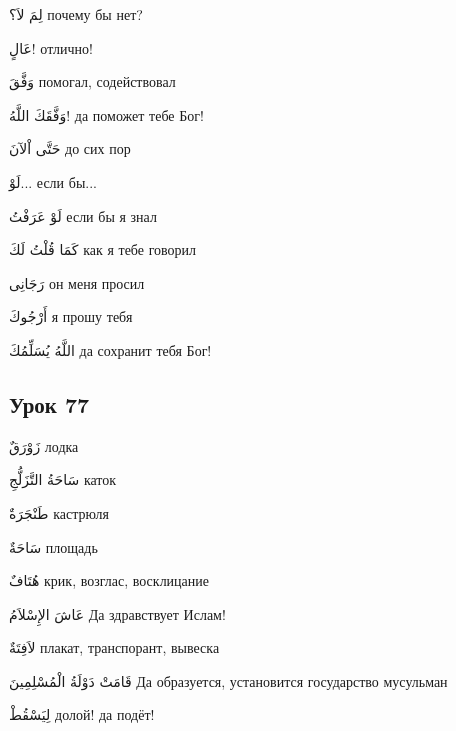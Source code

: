\documentclass[a5paper]{article}
\newcommand\textstyleDropCaps[1]{#1}
\newcommand\textstyleCaptioncharacters[1]{#1}
\begin{document}
\textstyleCaptioncharacters{لِمَ لاَ؟ }\textstyleDropCaps{почему бы нет?‎}

\textstyleCaptioncharacters{عَالٍ!ِ }\textstyleDropCaps{отлично!‎}

\textstyleCaptioncharacters{وَفَّقَ }\textstyleDropCaps{помогал, содейство­вал‎}

\textstyleCaptioncharacters{وَفَّقَكَ اللَّهُ!ِ }\textstyleDropCaps{да поможет тебе Бог!‎}

\textstyleCaptioncharacters{حَتَّى اْلآنَ }\textstyleDropCaps{до сих пор‎}

\textstyleCaptioncharacters{لَوْ...ِ }\textstyleDropCaps{если бы...‎}

\textstyleCaptioncharacters{لَوْ عَرَفْتُ }\textstyleDropCaps{если бы я знал‎}

\textstyleCaptioncharacters{كَمَا قُلْتُ لَكَ }\textstyleDropCaps{как я тебе говорил‎}

\textstyleCaptioncharacters{رَجَانِى }\textstyleDropCaps{он меня просил‎}

\textstyleCaptioncharacters{أَرْجُوكَ }\textstyleDropCaps{я прошу тебя‎}

\textstyleCaptioncharacters{اللَّهُ يُسَلِّمُكَ }\textstyleDropCaps{да сохранит тебя Бог!‎}

\subsection[Урок 77‎]{\textstyleDropCaps{Урок 77‎}}
\textstyleCaptioncharacters{زَوْرَقٌ }\textstyleDropCaps{лодка‎}

\textstyleCaptioncharacters{سَاحَةُ التَّزَلُّجِ }\textstyleDropCaps{каток‎}

\textstyleCaptioncharacters{طَنْجَرَةٌ }\textstyleDropCaps{кастрюля‎}

\textstyleCaptioncharacters{سَاحَةٌ }\textstyleDropCaps{площадь‎}

\textstyleCaptioncharacters{هُتَافٌ }\textstyleDropCaps{крик, возглас, восклицание‎}

\textstyleCaptioncharacters{عَاشَ الإِسْلاَمُ }\textstyleDropCaps{Да здрав­ствует Ислам!‎}

\textstyleCaptioncharacters{لاَفِتَةٌ }\textstyleDropCaps{плакат, транспо­рант, вывеска‎}

\textstyleCaptioncharacters{قَامَتْ دَوْلَةُ الْمُسْلِمِينَ }\textstyleDropCaps{Да образуется, установится государство мусульман‎}

\textstyleCaptioncharacters{لِيَسْقُطْ }\textstyleDropCaps{долой! да подёт!‎}
\end{document}
